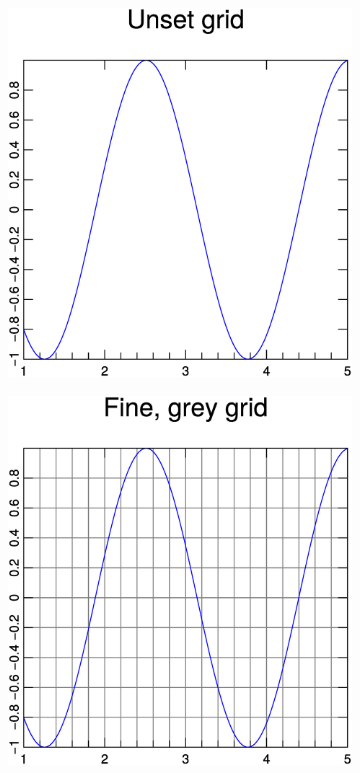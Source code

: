 \documentclass[a4paper]{article}
\begin{document}
\begin{figure}[h]
  \centering
  \begin{subfigure}[hb]{.32\linewidth}
    \includegraphics[width=\textwidth]{./examples_from_doc/grid/grid_1.eps}
  \end{subfigure}
    \hspace{2cm}
  \begin{subfigure}[hb]{.32\linewidth}
    \includegraphics[width=\textwidth]{./examples_from_doc/grid/grid_2.eps}
  \end{subfigure}
\end{figure}
\end{document}
